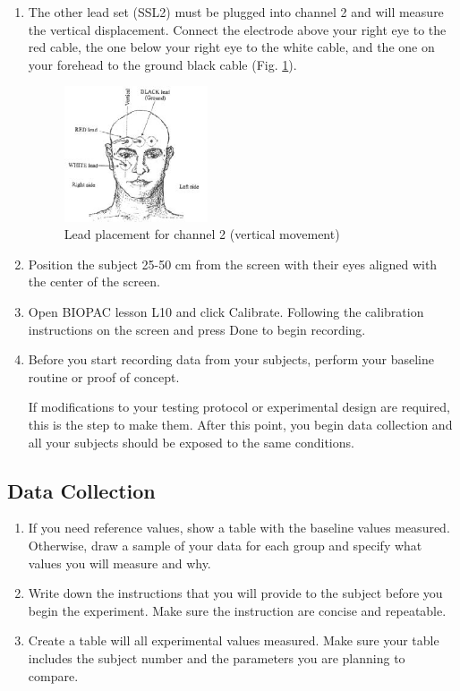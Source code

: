 \documentclass{article}
\begin{document}
\begin{enumerate}
	\item The other lead set (SSL2) must be plugged into channel 2 and will measure the vertical displacement. Connect the electrode above your right eye to the red cable, the one below your right eye to the white cable, and the one on your forehead to the ground black cable (Fig. \ref{setup3}).
	
	\begin{figure}[h]
	\centering\includegraphics[width=0.4\textwidth]{../images/EOG_4.jpg}
	\caption{Lead placement for channel 2 (vertical movement)}
	\label{setup3}
	\end{figure}
	
	\item Position the subject 25-50 cm from the screen with their eyes aligned with the center of the screen.
	\item Open BIOPAC lesson L10 and click Calibrate. Following the calibration instructions on the screen and press Done to begin recording.
	\item Before you start recording data from your subjects, perform your baseline routine or proof of concept.
	
	\begin{info}
		If modifications to your testing protocol or experimental design are required, this is the step to make them. After this point, you begin data collection and all your subjects should be exposed to the same conditions.
	\end{info}
\end{enumerate}

\subsection*{Data Collection}
\begin{enumerate}
	\item If you need reference values, show a table with the baseline values measured. Otherwise, draw a sample of your data for each group and specify what values you will measure and why.
	\item Write down the instructions that you will provide to the subject before you begin the experiment. Make sure the instruction are concise and repeatable.
	\item Create a table will all experimental values measured. Make sure your table includes the subject number and the parameters you are planning to compare.
\end{enumerate}
\end{document}
